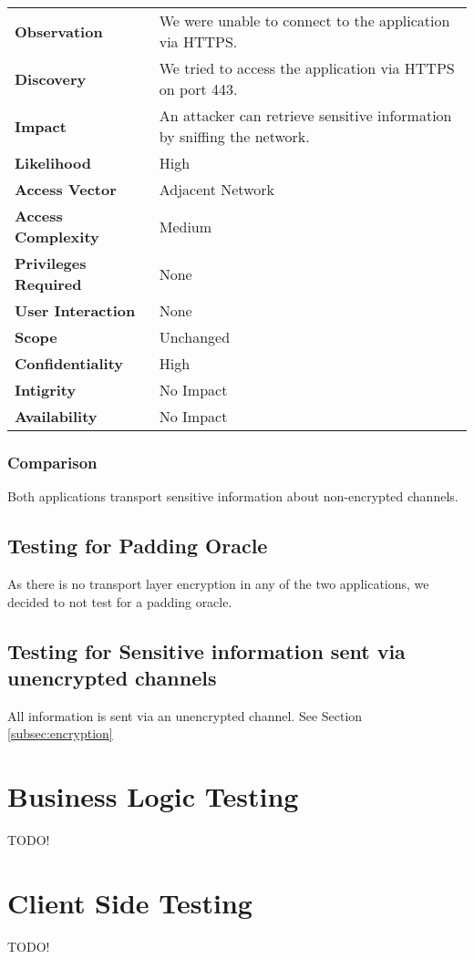 \begin{tabular}{l|p{10cm}}

\textbf{Observation} & We were unable to connect to the application via HTTPS.  \\
\textbf{Discovery} & We tried to access the application via HTTPS on port 443. \\
\textbf{Impact} & An attacker can retrieve sensitive information by sniffing the network. \\
\textbf{Likelihood} & High \\
\textbf{Access Vector} & Adjacent Network \\
\textbf{Access Complexity} & Medium \\
\textbf{Privileges Required} & None \\
\textbf{User Interaction} & None \\
\textbf{Scope} & Unchanged \\
\textbf{Confidentiality} & High \\
\textbf{Intigrity} & No Impact \\
\textbf{Availability} & No Impact \\
\end{tabular}

\subsubsection*{Comparison}
Both applications transport sensitive information about non-encrypted channels.

\subsection{Testing for Padding Oracle}
As there is no transport layer encryption in any of the two applications, we decided to not test for a padding oracle.

\subsection{Testing for Sensitive information sent via unencrypted channels}
All information is sent via an unencrypted channel. See Section \ref{subsec:encryption}

\section{Business Logic Testing}
TODO!

\section{Client Side Testing}
TODO!

